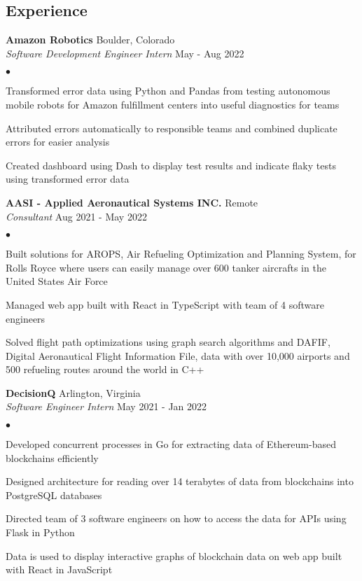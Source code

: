 \documentclass[margin,line]{res}
\newenvironment{list2}{
  \begin{list}{$\bullet$}{%
      \setlength{\itemsep}{0in}
      \setlength{\parsep}{0in} \setlength{\parskip}{0in}
      \setlength{\topsep}{0in} \setlength{\partopsep}{0in} 
      \setlength{\leftmargin}{0.2in}}}{\end{list}}
\begin{document}
\begin{resume}
  \section{\sc Experience}
   {\bf Amazon Robotics} \hfill Boulder, Colorado \\
  {\em Software Development Engineer Intern} \hfill May - Aug 2022

  \begin{list2}
    \item Transformed error data using Python and Pandas from testing autonomous mobile robots for Amazon
    fulfillment centers into useful diagnostics for teams
    \item Attributed errors automatically to responsible teams and combined duplicate errors for easier analysis
    \item Created dashboard using Dash to display test results and indicate flaky tests using transformed error data
  \end{list2}

  {\bf AASI - Applied Aeronautical Systems INC.} \hfill Remote \\
  {\em Consultant} \hfill Aug 2021 - May 2022

  \begin{list2}
    \item Built solutions for AROPS, Air Refueling Optimization and Planning System, for Rolls Royce where users can
    easily manage over 600 tanker aircrafts in the United States Air Force
    \item Managed web app built with React in TypeScript with team of 4 software engineers
    \item Solved flight path optimizations using graph search algorithms and DAFIF, Digital Aeronautical Flight
    Information File, data with over 10,000 airports and 500 refueling routes around the world in C++
  \end{list2}


  {\bf DecisionQ} \hfill Arlington, Virginia \\
  {\em Software Engineer Intern} \hfill May 2021 - Jan 2022

  \begin{list2}
    \item Developed concurrent processes in Go for extracting data of Ethereum-based blockchains efficiently
    \item Designed architecture for reading over 14 terabytes of data from blockchains into PostgreSQL databases
    \item Directed team of 3 software engineers on how to access the data for APIs using Flask in Python
    \item Data is used to display interactive graphs of blockchain data on web app built with React in JavaScript
  \end{list2}


\end{resume}
\end{document}
